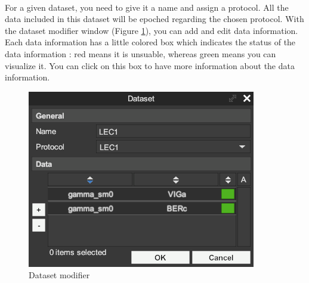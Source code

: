 \documentclass[a4paper]{article}
\begin{document}
\paragraph{} For a given dataset, you need to give it a name and assign a protocol. All the data included in this dataset will be epoched regarding the chosen protocol. With the dataset modifier window (Figure \ref{datasetModifierUI}), you can add and edit data information. Each data information has a little colored box which indicates the status of the data information : red means it is unsuable, whereas green means you can visualize it. You can click on this box to have more information about the data information.
\begin{figure}[H]
\begin{center}
\includegraphics[scale=0.5]{DatasetModifier.png}
\end{center}
\caption{\label{datasetModifierUI}Dataset modifier}
\end{figure}
\end{document}
